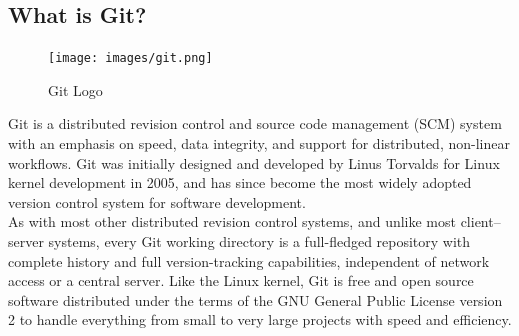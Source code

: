 \subsection{What is Git?}
\begin{figure}[H]
\centering
\texttt{[image: images/git.png]}                   
\caption{Git Logo}
\hspace{-1.5em}
\end{figure}
Git is a distributed revision control and source code management (SCM) system with an emphasis on speed, data integrity, and support for distributed, non-linear workflows. Git was initially designed and developed by Linus Torvalds for Linux kernel development in 2005, and has since become the most widely adopted version control system for software development.\\

As with most other distributed revision control systems, and unlike most client–server systems, every Git working directory is a full-fledged repository with complete history and full version-tracking capabilities, independent of network access or a central server. Like the Linux kernel, Git is free and open source software distributed under the terms of the GNU General Public License version 2 to handle everything from small to very large projects with speed and efficiency.\\
